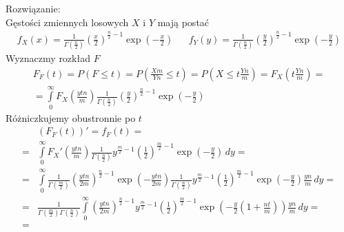 Rozwiązanie:\\
Gęstości zmiennych losowych $ X $ i $ Y $ mają postać
\begin{align*}
f_X(x)=\frac{1}{\Gamma(\frac{n}{2})}\left(\frac{x}{2}\right)^{\frac{n}{2}-1}\exp \left(-\frac{x}{2}\right)
&&
f_Y(y)=\frac{1}{\Gamma(\frac{n}{2})}\left(\frac{y}{2}\right)^{\frac{n}{2}-1}\exp \left(-\frac{y}{2}\right)
\end{align*}
Wyznaczmy rozkład $ F $
\begin{gather*}
F_F(t)=
P\left(F\le t\right)=
P\left(\frac{Xm}{Yn}\le t\right)=
P\left(X\le t\frac{Yn}{m}\right)=F_X\left(t\frac{Yn}{m}\right)
=\\=
\int\limits_{0}^{\infty }
F_X\left(\frac{ytn}{m}\right)
\frac{1}{\Gamma(\frac{n}{2})}\left(\frac{y}{2}\right)^{\frac{n}{2}-1}\exp \left(-\frac{y}{2}\right)
\end{gather*}
Różniczkujemy obustronnie po $ t $
\begin{align*}
&\left(F_F(t)\right)'=f_F(t)
=\\=&
\int\limits_{0}^{\infty }
F_X'\left(\frac{ytn}{m}\right)
\frac{1}{\Gamma(\frac{n}{2})}y^{\frac{m}{2}-1}\left(\frac{1}{2}\right)^{\frac{m}{2}-1}\exp \left(-\frac{y}{2}\right)\,dy
=\\=&
\int\limits_{0}^{\infty }
\frac{1}{\Gamma(\frac{m}{2})}\left(\frac{ytn}{2m}\right)^{\frac{n}{2}-1}\exp \left(-\frac{ytn}{2m}\right)
\frac{1}{\Gamma(\frac{n}{2})}y^{\frac{m}{2}-1}\left(\frac{1}{2}\right)^{\frac{m}{2}-1}\exp \left(-\frac{y}{2}\right)\frac{yn}{m}\,dy
=\\=&
\frac{1}{\Gamma(\frac{m}{2})\Gamma(\frac{n}{2})}
\int\limits_{0}^{\infty }
\left(\frac{ytn}{2m}\right)^{\frac{n}{2}-1}
y^{\frac{m}{2}-1}\left(\frac{1}{2}\right)^{\frac{m}{2}-1}\exp \left(-\frac{y}{2}\left(1+\frac{n t}{m}\right)\right)\frac{yn}{m}\,dy
=\\=&
\end{align*}


